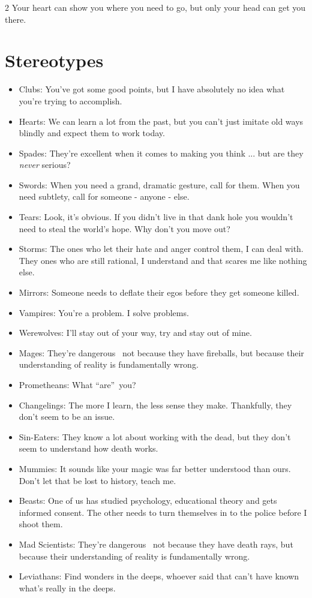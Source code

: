 \begin{multicols}{2}
Your heart can show you where you need to go, but only your head can get you there. 

\section*{Stereotypes}

\begin{itemize}
\item Clubs: You've got some good points, but I have absolutely no idea what you're trying to accomplish.
\item Hearts: We can learn a lot from the past, but you can't just imitate old ways blindly and expect them to work today.
\item Spades: They're excellent when it comes to making you think ... but are they \textit{never} serious?
\item Swords: When you need a grand, dramatic gesture, call for them. When you need subtlety, call for someone - anyone - else.
\item Tears: Look, it's obvious. If you didn't live in that dank hole you wouldn't need to steal the world's hope. Why don't you move out?
\item Storms: The ones who let their hate and anger control them, I can deal with. They ones who are still rational, I understand and that scares me like nothing else.
\item Mirrors: Someone needs to deflate their egos before they get someone killed.

\item Vampires: You're a problem. I solve problems.
\item Werewolves: I'll stay out of your way, try and stay out of mine.
\item Mages: They're dangerous \textendash\, not because they have fireballs, but because their understanding of reality is fundamentally wrong.
\item Prometheans: What \textquotedblleft are\textquotedblright\, you?
\item Changelings: The more I learn, the less sense they make. Thankfully, they don't seem to be an issue.
\item Sin-Eaters: They know a lot about working with the dead, but they don't seem to understand how death works.
\item Mummies: It sounds like your magic was far better understood than ours. Don't let that be lost to history, teach me. 
\item Beasts: One of us has studied psychology, educational theory and gets informed consent. The other needs to turn themselves in to the police before I shoot them.
\item Mad Scientists: They're dangerous \textendash\, not because they have death rays, but because their understanding of reality is fundamentally wrong.
\item Leviathans: Find wonders in the deeps, whoever said that can't have known what's really in the deeps.


\end{itemize}
\end{multicols}
